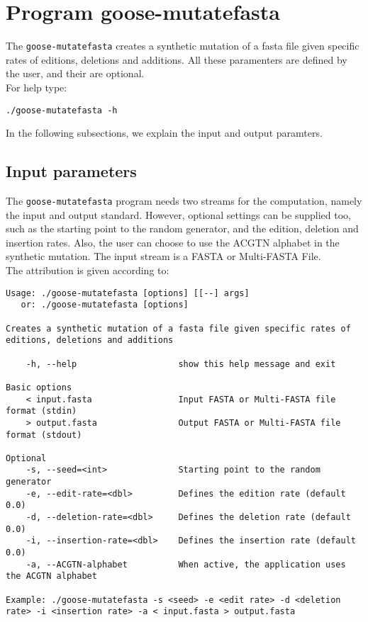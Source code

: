 \section{Program goose-mutatefasta}
The \texttt{goose-mutatefasta} creates a synthetic mutation of a fasta file given specific rates of editions, deletions and additions. All these paramenters are defined by the user, and their are optional.\\
For help type:
\begin{lstlisting}
./goose-mutatefasta -h
\end{lstlisting}
In the following subsections, we explain the input and output paramters.

\subsection*{Input parameters}

The \texttt{goose-mutatefasta} program needs two streams for the computation, namely the input and output standard. However, optional settings can be supplied too, such as the starting point to the random generator, and the edition, deletion and insertion rates. Also, the user can choose to use the ACGTN alphabet in the synthetic mutation. The input stream is a FASTA or Multi-FASTA File.\\
The attribution is given according to:
\begin{lstlisting}
Usage: ./goose-mutatefasta [options] [[--] args]
   or: ./goose-mutatefasta [options]

Creates a synthetic mutation of a fasta file given specific rates of editions, deletions and additions

    -h, --help                    show this help message and exit

Basic options
    < input.fasta                 Input FASTA or Multi-FASTA file format (stdin)
    > output.fasta                Output FASTA or Multi-FASTA file format (stdout)

Optional
    -s, --seed=<int>              Starting point to the random generator
    -e, --edit-rate=<dbl>         Defines the edition rate (default 0.0)
    -d, --deletion-rate=<dbl>     Defines the deletion rate (default 0.0)
    -i, --insertion-rate=<dbl>    Defines the insertion rate (default 0.0)
    -a, --ACGTN-alphabet          When active, the application uses the ACGTN alphabet

Example: ./goose-mutatefasta -s <seed> -e <edit rate> -d <deletion rate> -i <insertion rate> -a < input.fasta > output.fasta
\end{lstlisting}

